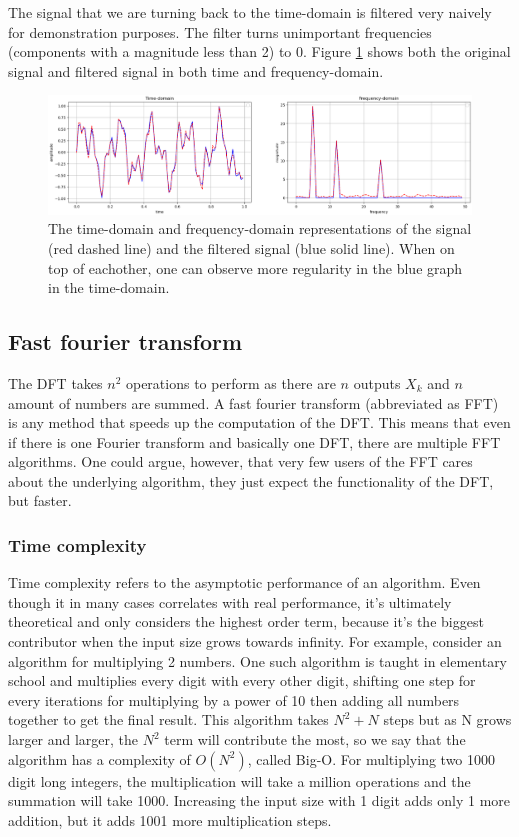 The signal that we are turning back to the time-domain is filtered very naively for demonstration purposes. The filter turns unimportant frequencies (components with a magnitude less than 2) to 0. Figure \ref{fig:DFT-IDFT} shows both the original signal and filtered signal in both time and frequency-domain.

\begin{figure}[ht]
    \centering
    \includegraphics[width=\textwidth]{./images/filtered_signal.png}
    \caption{The time-domain and frequency-domain representations of the signal (red dashed line) and the filtered signal (blue solid line). When on top of eachother, one can observe more regularity in the blue graph in the time-domain.\label{fig:DFT-IDFT}}
\end{figure}

\subsection{Fast fourier transform}
The DFT takes $n^2$ operations to perform as there are $n$ outputs $X_k$ and $n$ amount of numbers are summed. A fast fourier transform (abbreviated as FFT) is any method that speeds up the computation of the DFT. This means that even if there is one Fourier transform and basically one DFT, there are multiple FFT algorithms. One could argue, however, that very few users of the FFT cares about the underlying algorithm, they just expect the functionality of the DFT, but faster. 

\subsubsection{Time complexity}
Time complexity refers to the asymptotic performance of an algorithm. Even though it in many cases correlates with real performance, it's ultimately theoretical and only considers the highest order term, because it's the biggest contributor when the input size grows towards infinity. For example, consider an algorithm for multiplying 2 numbers. One such algorithm is taught in elementary school and multiplies every digit with every other digit, shifting one step for every iterations for multiplying by a power of 10 then adding all numbers together to get the final result. This algorithm takes $N^2+N$ steps but as N grows larger and larger, the $N^2$ term will contribute the most, so we say that the algorithm has a complexity of $O(N^2)$, called Big-O. For multiplying two 1000 digit long integers, the multiplication will take a million operations and the summation will take 1000. Increasing the input size with 1 digit adds only 1 more addition, but it adds 1001 more multiplication steps.

